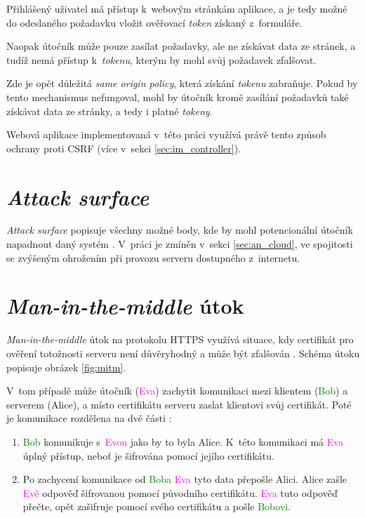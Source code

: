 Přihlášený uživatel má přístup k~webovým stránkám aplikace, a je tedy možné do odeslaného požadavku vložit ověřovací \textit{token} získaný z~formuláře. 

Naopak útočník může pouze zasílat požadavky, ale ne získávat data ze stránek, a tudíž nemá přístup k~\textit{tokenu}, kterým by mohl svůj požadavek zfalšovat.

Zde je opět důležitá \textit{same origin policy}, která získání \textit{tokenu} zabraňuje. Pokud by tento mechanismus nefungoval, mohl by útočník kromě zasílání požadavků také získávat data ze stránky, a tedy i platné \textit{tokeny}.

Webová aplikace implementovaná v~této práci využívá právě tento způsob ochrany proti CSRF (více v~sekci \ref{sec:im_controller}).

\section{\textit{Attack surface}}

\textit{Attack surface} popisuje všechny možné body, kde by mohl potencionální útočník napadnout daný systém \cite{attack_surface_owasp}. V~práci je zmíněn v~sekci \ref{sec:an_cloud}, ve spojitosti se zvýšeným ohrožením při provozu serveru dostupného z~internetu.

\section{\textit{Man-in-the-middle} útok}
\label{sec:th_mitm}

\textit{Man-in-the-middle} útok na protokolu HTTPS využívá situace, kdy certifikát pro ověření totožnosti serveru není důvěryhodný a může být zfalšován \cite{mitm}. Schéma útoku popisuje obrázek \ref{fig:mitm}. 

V~tom případě může útočník (\textcolor{magenta}{Eva}) zachytit komunikaci mezi klientem (\textcolor{green}{Bob}) a serverem (\textcolor{blue2}{Alice}), a místo certifikátu serveru zaslat klientovi svůj certifikát. Poté je komunikace rozdělena na dvě části \cite{mitm}:

\begin{enumerate}
    \item \textcolor{green}{Bob} komunikuje s~\textcolor{magenta}{Evou} jako by to byla \textcolor{blue2}{Alice}. K~této komunikaci má \textcolor{magenta}{Eva} úplný přístup, neboť je šifrována pomocí jejího certifikátu.
    \item Po zachycení komunikace od \textcolor{green}{Boba} \textcolor{magenta}{Eva} tyto data přepošle \textcolor{blue2}{Alici}. \textcolor{blue2}{Alice} zašle \textcolor{magenta}{Evě} odpověď šifrovanou pomocí původního certifikátu. \textcolor{magenta}{Eva} tuto odpověď přečte, opět zašifruje pomocí svého certifikátu a pošle \textcolor{green}{Bobovi}.
\end{enumerate}


